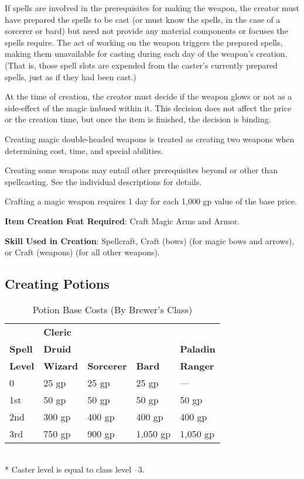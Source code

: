 If spells are involved in the prerequisites for making the weapon, the creator must have prepared the spells to be cast (or must know the spells, in the case of a sorcerer or bard) but need not provide any material components or focuses the spells require. The act of working on the weapon triggers the prepared spells, making them unavailable for casting during each day of the weapon's creation. (That is, those spell slots are expended from the caster's currently prepared spells, just as if they had been cast.)
				
At the time of creation, the creator must decide if the weapon glows or not as a side-effect of the magic imbued within it. This decision does not affect the price or the creation time, but once the item is finished, the decision is binding.
				
Creating magic double-headed weapons is treated as creating two weapons when determining cost, time, and special abilities.
				
Creating some weapons may entail other prerequisites beyond or other than spellcasting. See the individual descriptions for details.
				
Crafting a magic weapon requires 1 day for each 1,000 gp value of the base price.
				
\textbf{Item Creation Feat Required}: Craft Magic Arms and Armor.
				
\textbf{Skill Used in Creation}: Spellcraft, Craft (bows) (for magic bows and arrows), or Craft (weapons) (for all other weapons).
				
\subsection{Creating Potions}


\begin{table}[]
\sffamily
\caption{Potion Base Costs (By Brewer's Class)}
\begin{tabular}{lllll}
               & \textbf{Cleric} & \\
\textbf{Spell} & \textbf{Druid}  &                   &               & \textbf{Paladin} \\
\textbf{Level} & \textbf{Wizard} & \textbf{Sorcerer} & \textbf{Bard} & \textbf{Ranger} \\
0                    & 25 gp                          & 25 gp             & 25 gp         & ---                         \\
1st                  & 50 gp                          & 50 gp             & 50 gp         & 50 gp                     \\
2nd                  & 300 gp                         & 400 gp            & 400 gp        & 400 gp                    \\
3rd                  & 750 gp                         & 900 gp            & 1,050 gp      & 1,050 gp                 
\end{tabular}\\
* Caster level is equal to class level --3.
\end{table}

